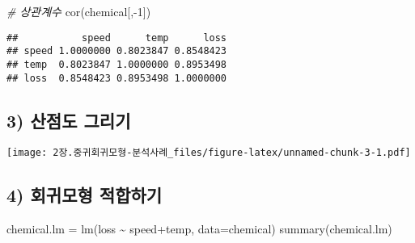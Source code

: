 \documentclass[
]{article}
\newenvironment{Shaded}{\begin{snugshade}}{\end{snugshade}}
\newcommand{\AttributeTok}[1]{\textcolor[rgb]{0.77,0.63,0.00}{#1}}
\newcommand{\CommentTok}[1]{\textcolor[rgb]{0.56,0.35,0.01}{\textit{#1}}}
\newcommand{\DecValTok}[1]{\textcolor[rgb]{0.00,0.00,0.81}{#1}}
\newcommand{\FunctionTok}[1]{\textcolor[rgb]{0.00,0.00,0.00}{#1}}
\newcommand{\NormalTok}[1]{#1}
\newcommand{\OtherTok}[1]{\textcolor[rgb]{0.56,0.35,0.01}{#1}}
\newcommand{\SpecialCharTok}[1]{\textcolor[rgb]{0.00,0.00,0.00}{#1}}
\newcommand{\StringTok}[1]{\textcolor[rgb]{0.31,0.60,0.02}{#1}}
\begin{document}
\begin{Shaded}
\begin{Highlighting}[]
\CommentTok{\# 상관계수}
\FunctionTok{cor}\NormalTok{(chemical[,}\SpecialCharTok{{-}}\DecValTok{1}\NormalTok{])}
\end{Highlighting}
\end{Shaded}

\begin{verbatim}
##           speed      temp      loss
## speed 1.0000000 0.8023847 0.8548423
## temp  0.8023847 1.0000000 0.8953498
## loss  0.8548423 0.8953498 1.0000000
\end{verbatim}

\hypertarget{uxc0b0uxc810uxb3c4-uxadf8uxb9acuxae30}{%
\subsection{3) 산점도
그리기}\label{uxc0b0uxc810uxb3c4-uxadf8uxb9acuxae30}}

\begin{Shaded}
\end{Shaded}

\texttt{[image: 2장.중귀회귀모형-분석사례\_files/figure-latex/unnamed-chunk-3-1.pdf]}

\hypertarget{uxd68cuxadc0uxbaa8uxd615-uxc801uxd569uxd558uxae30}{%
\subsection{4) 회귀모형
적합하기}\label{uxd68cuxadc0uxbaa8uxd615-uxc801uxd569uxd558uxae30}}

\begin{Shaded}
\begin{Highlighting}[]
\NormalTok{chemical.lm }\OtherTok{=} \FunctionTok{lm}\NormalTok{(loss }\SpecialCharTok{\textasciitilde{}}\NormalTok{ speed}\SpecialCharTok{+}\NormalTok{temp, }\AttributeTok{data=}\NormalTok{chemical) }
\FunctionTok{summary}\NormalTok{(chemical.lm)}
\end{Highlighting}
\end{Shaded}
\end{document}
